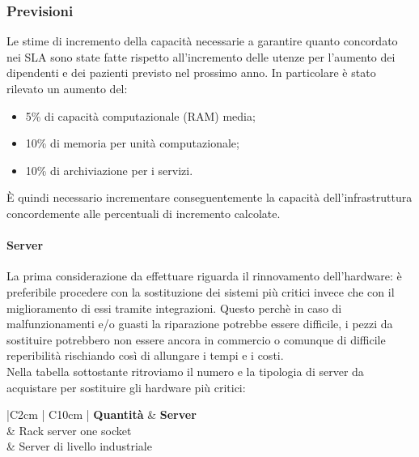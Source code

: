 \subsubsection{Previsioni}
	Le stime di incremento della capacità necessarie a garantire quanto concordato nei SLA sono state fatte rispetto all’incremento delle utenze per l'aumento dei dipendenti e dei pazienti previsto nel prossimo anno.
In particolare è stato rilevato un aumento del:
\begin{itemize}
	\item 5\% di capacità computazionale (RAM) media;
	\item 10\% di memoria per unità computazionale;
	\item 10\% di archiviazione per i servizi.
\end{itemize}
È quindi necessario incrementare conseguentemente la capacità dell’infrastruttura
concordemente alle percentuali di incremento calcolate.


	\paragraph{Server}
	La prima considerazione da effettuare riguarda il rinnovamento dell'hardware: è preferibile procedere con la sostituzione dei sistemi più critici invece che con il miglioramento di essi tramite integrazioni. Questo perchè in caso di malfunzionamenti e/o guasti la riparazione potrebbe essere difficile, i pezzi da sostituire potrebbero non essere ancora in commercio o comunque di difficile reperibilità rischiando così di allungare i tempi e i costi. \\
	Nella tabella sottostante ritroviamo il numero e la tipologia di server da acquistare per sostituire gli hardware più critici:
	\begin{table}[h]
		\centering
		\begin{tabular}{|C{2cm} | C{10cm} |} 
			\hline
			\textbf{Quantità}  & \textbf{Server} \\  & Rack server one socket   \\  & Server di livello industriale   \\ \hline
		\end{tabular}
		\caption{Analisi nuovi server}\label{tab:analisiServer}
	\end{table}
	
